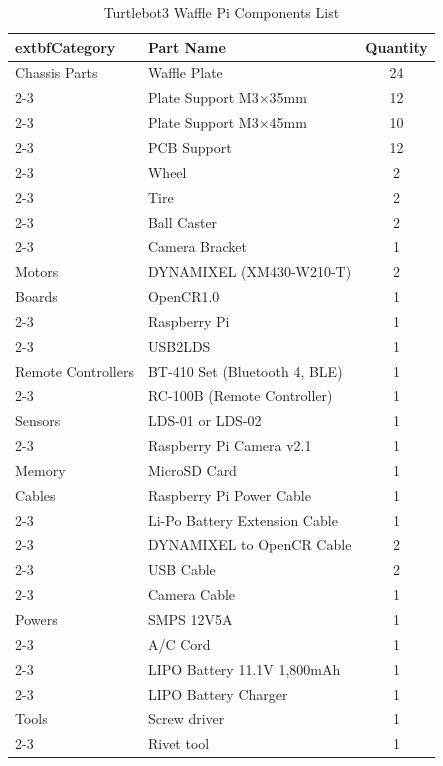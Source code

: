 \begin{table}[htbp]
	\centering
	\caption{Turtlebot3 Waffle Pi Components List}
	\label{tab:turtlebot3_components_list}
	\begin{tabular}{|m{3.5cm}|l|c|}
	\hline
		extbf{Category} & \textbf{Part Name} & \textbf{Quantity} \\
	\hline
	Chassis Parts & Waffle Plate & 24 \\
	\cline{2-3} & Plate Support M3$\times$35mm & 12 \\
	\cline{2-3} & Plate Support M3$\times$45mm & 10 \\
	\cline{2-3} & PCB Support & 12 \\
	\cline{2-3} & Wheel & 2 \\
	\cline{2-3} & Tire & 2 \\
	\cline{2-3} & Ball Caster & 2 \\
	\cline{2-3} & Camera Bracket & 1 \\
	\hline
	Motors & DYNAMIXEL (XM430-W210-T) & 2 \\
	\hline
	Boards & OpenCR1.0 & 1 \\
	\cline{2-3} & Raspberry Pi & 1 \\
	\cline{2-3} & USB2LDS & 1 \\
	\hline
	Remote Controllers & BT-410 Set (Bluetooth 4, BLE) & 1 \\
	\cline{2-3} & RC-100B (Remote Controller) & 1 \\
	\hline
	Sensors & LDS-01 or LDS-02 & 1 \\
	\cline{2-3} & Raspberry Pi Camera v2.1 & 1 \\
	\hline
	Memory & MicroSD Card & 1 \\
	\hline
	Cables & Raspberry Pi Power Cable & 1 \\
	\cline{2-3} & Li-Po Battery Extension Cable & 1 \\
	\cline{2-3} & DYNAMIXEL to OpenCR Cable & 2 \\
	\cline{2-3} & USB Cable & 2 \\
	\cline{2-3} & Camera Cable & 1 \\
	\hline
	Powers & SMPS 12V5A & 1 \\
	\cline{2-3} & A/C Cord & 1 \\
	\cline{2-3} & LIPO Battery 11.1V 1,800mAh & 1 \\
	\cline{2-3} & LIPO Battery Charger & 1 \\
	\hline
	Tools & Screw driver & 1 \\
	\cline{2-3} & Rivet tool & 1 \\

\end{tabular}
\end{table}

